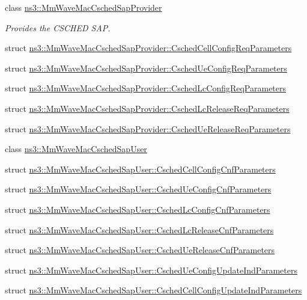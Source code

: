 \begin{DoxyCompactItemize}
\item 
class \hyperlink{classns3_1_1MmWaveMacCschedSapProvider}{ns3\+::\+Mm\+Wave\+Mac\+Csched\+Sap\+Provider}
\begin{DoxyCompactList}\small\item\em Provides the C\+S\+C\+H\+ED S\+AP. \end{DoxyCompactList}\item 
struct \hyperlink{structns3_1_1MmWaveMacCschedSapProvider_1_1CschedCellConfigReqParameters}{ns3\+::\+Mm\+Wave\+Mac\+Csched\+Sap\+Provider\+::\+Csched\+Cell\+Config\+Req\+Parameters}
\item 
struct \hyperlink{structns3_1_1MmWaveMacCschedSapProvider_1_1CschedUeConfigReqParameters}{ns3\+::\+Mm\+Wave\+Mac\+Csched\+Sap\+Provider\+::\+Csched\+Ue\+Config\+Req\+Parameters}
\item 
struct \hyperlink{structns3_1_1MmWaveMacCschedSapProvider_1_1CschedLcConfigReqParameters}{ns3\+::\+Mm\+Wave\+Mac\+Csched\+Sap\+Provider\+::\+Csched\+Lc\+Config\+Req\+Parameters}
\item 
struct \hyperlink{structns3_1_1MmWaveMacCschedSapProvider_1_1CschedLcReleaseReqParameters}{ns3\+::\+Mm\+Wave\+Mac\+Csched\+Sap\+Provider\+::\+Csched\+Lc\+Release\+Req\+Parameters}
\item 
struct \hyperlink{structns3_1_1MmWaveMacCschedSapProvider_1_1CschedUeReleaseReqParameters}{ns3\+::\+Mm\+Wave\+Mac\+Csched\+Sap\+Provider\+::\+Csched\+Ue\+Release\+Req\+Parameters}
\item 
class \hyperlink{classns3_1_1MmWaveMacCschedSapUser}{ns3\+::\+Mm\+Wave\+Mac\+Csched\+Sap\+User}
\item 
struct \hyperlink{structns3_1_1MmWaveMacCschedSapUser_1_1CschedCellConfigCnfParameters}{ns3\+::\+Mm\+Wave\+Mac\+Csched\+Sap\+User\+::\+Csched\+Cell\+Config\+Cnf\+Parameters}
\item 
struct \hyperlink{structns3_1_1MmWaveMacCschedSapUser_1_1CschedUeConfigCnfParameters}{ns3\+::\+Mm\+Wave\+Mac\+Csched\+Sap\+User\+::\+Csched\+Ue\+Config\+Cnf\+Parameters}
\item 
struct \hyperlink{structns3_1_1MmWaveMacCschedSapUser_1_1CschedLcConfigCnfParameters}{ns3\+::\+Mm\+Wave\+Mac\+Csched\+Sap\+User\+::\+Csched\+Lc\+Config\+Cnf\+Parameters}
\item 
struct \hyperlink{structns3_1_1MmWaveMacCschedSapUser_1_1CschedLcReleaseCnfParameters}{ns3\+::\+Mm\+Wave\+Mac\+Csched\+Sap\+User\+::\+Csched\+Lc\+Release\+Cnf\+Parameters}
\item 
struct \hyperlink{structns3_1_1MmWaveMacCschedSapUser_1_1CschedUeReleaseCnfParameters}{ns3\+::\+Mm\+Wave\+Mac\+Csched\+Sap\+User\+::\+Csched\+Ue\+Release\+Cnf\+Parameters}
\item 
struct \hyperlink{structns3_1_1MmWaveMacCschedSapUser_1_1CschedUeConfigUpdateIndParameters}{ns3\+::\+Mm\+Wave\+Mac\+Csched\+Sap\+User\+::\+Csched\+Ue\+Config\+Update\+Ind\+Parameters}
\item 
struct \hyperlink{structns3_1_1MmWaveMacCschedSapUser_1_1CschedCellConfigUpdateIndParameters}{ns3\+::\+Mm\+Wave\+Mac\+Csched\+Sap\+User\+::\+Csched\+Cell\+Config\+Update\+Ind\+Parameters}
\end{DoxyCompactItemize}
